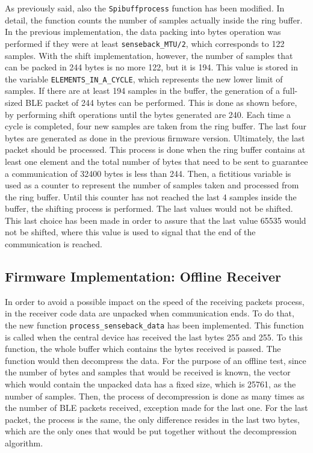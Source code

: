 \documentclass{Configuration_Files/PoliMi3i_thesis}
\begin{document}
As previously said, also the \texttt{Spibuffprocess} function has been modified. In detail, the function counts the number of samples actually inside the ring buffer. In the previous implementation, the data packing into bytes operation was performed if they were at least \texttt{senseback\_MTU/2}, which corresponds to 122 samples. With the shift implementation, however, the number of samples that can be packed in 244 bytes is no more 122, but it is 194. This value is stored in the variable \texttt{ELEMENTS\_IN\_A\_CYCLE}, which represents the new lower limit of samples. If there are at least 194 samples in the buffer, the generation of a full-sized BLE packet of 244 bytes can be performed. This is done as shown before, by performing shift operations until the bytes generated are 240. Each time a cycle is completed, four new samples are taken from the ring buffer. The last four bytes are generated as done in the previous firmware version. Ultimately, the last packet should be processed. This process is done when the ring buffer contains at least one element and the total number of bytes that need to be sent to guarantee a communication of 32400 bytes is less than 244. Then, a fictitious variable is used as a counter to represent the number of samples taken and processed from the ring buffer. Until this counter has not reached the last 4 samples inside the buffer, the shifting process is performed. The last values would not be shifted. This last choice has been made in order to assure that the last value 65535 would not be shifted, where this value is used to signal that the end of the communication is reached. 

\subsection{Firmware Implementation: Offline Receiver}

In order to avoid a possible impact on the speed of the receiving packets process, in the receiver code data are unpacked when communication ends. To do that, the new function \texttt{process\_senseback\_data} has been implemented. This function is called when the central device has received the last bytes 255 and 255. To this function, the whole buffer which contains the bytes received is passed. The function would then decompress the data. For the purpose of an offline test, since the number of bytes and samples that would be received is known, the vector which would contain the unpacked data has a fixed size, which is 25761, as the number of samples. Then, the process of decompression is done as many times as the number of BLE packets received, exception made for the last one. For the last packet, the process is the same, the only difference resides in the last two bytes, which are the only ones that would be put together without the decompression algorithm.
\end{document}
